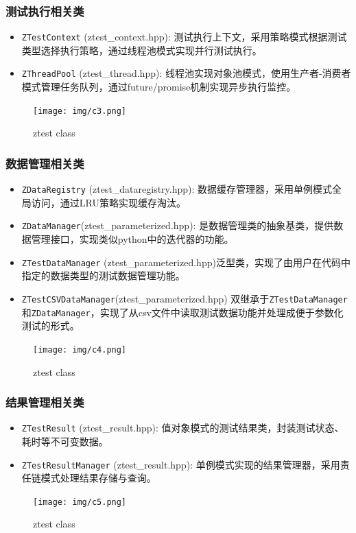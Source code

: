 \documentclass{article}
\begin{document}
\subsubsection{测试执行相关类}
\begin{itemize}
    \item \texttt{ZTestContext} (ztest\_context.hpp): 测试执行上下文，采用策略模式根据测试类型选择执行策略，通过线程池模式实现并行测试执行。
    \item \texttt{ZThreadPool} (ztest\_thread.hpp): 线程池实现对象池模式，使用生产者-消费者模式管理任务队列，通过future/promise机制实现异步执行监控。
\end{itemize}
\begin{figure}[H]
    \centering
    \texttt{[image: img/c3.png]} %
    \caption{ ztest class}
    \label{fig:ztest class }
\end{figure}
\subsubsection{数据管理相关类}
\begin{itemize}
    \item \texttt{ZDataRegistry} (ztest\_dataregistry.hpp): 数据缓存管理器，采用单例模式全局访问，通过LRU策略实现缓存淘汰。
    \item \texttt{ZDataManager}(ztest\_parameterized.hpp): 是数据管理类的抽象基类，提供数据管理接口，实现类似python中的迭代器的功能。
    \item \texttt{ZTestDataManager} (ztest\_parameterized.hpp)泛型类，实现了由用户在代码中指定的数据类型的测试数据管理功能。
    \item \texttt{ZTestCSVDataManager}(ztest\_parameterized.hpp) 双继承于\texttt{ZTestDataManager}和\texttt{ZDataManager}，实现了从csv文件中读取测试数据功能并处理成便于参数化测试的形式。
\end{itemize}
\begin{figure}[H]
    \centering
    \texttt{[image: img/c4.png]} %
    \caption{ ztest class}
    \label{fig:ztest class }
\end{figure}
\subsubsection{结果管理相关类}
\begin{itemize}
    \item \texttt{ZTestResult} (ztest\_result.hpp): 值对象模式的测试结果类，封装测试状态、耗时等不可变数据。
    \item \texttt{ZTestResultManager} (ztest\_result.hpp): 单例模式实现的结果管理器，采用责任链模式处理结果存储与查询。
\end{itemize}
\begin{figure}[H]
    \centering
    \texttt{[image: img/c5.png]} %
    \caption{ ztest class}
    \label{fig:ztest class }
\end{figure}
\end{document}
